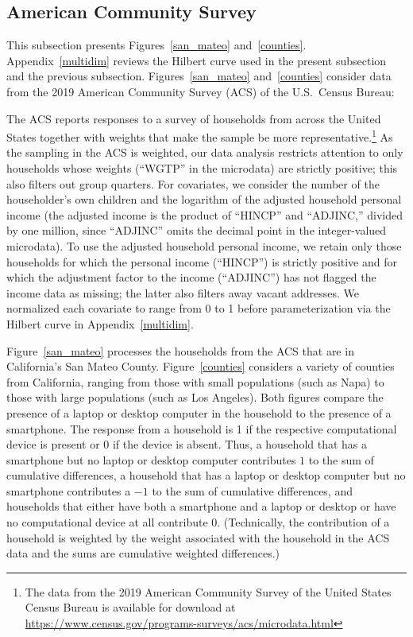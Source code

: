 \documentclass[]{fairmeta}
\begin{document}
\subsection{American Community Survey}
\label{acs}

This subsection presents Figures~\ref{san_mateo} and~\ref{counties}.
Appendix~\ref{multidim} reviews the Hilbert curve used
in the present subsection and the previous subsection.
Figures~\ref{san_mateo} and~\ref{counties} consider data
from the 2019 American Community Survey (ACS) of the U.S.\ Census Bureau:

The ACS reports responses to a survey of households from across the United
States together with weights that make the sample be more
representative.\footnote{The data from the 2019 American Community Survey
of the United States Census Bureau is available for download at
\url{https://www.census.gov/programs-surveys/acs/microdata.html}}
As the sampling in the ACS is weighted, our data analysis restricts attention
to only households whose weights (``WGTP'' in the microdata) are strictly
positive; this also filters out group quarters. For covariates, we consider
the number of the householder's own children and
the logarithm of the adjusted household personal income
(the adjusted income is the product of ``HINCP'' and ``ADJINC,''
divided by one million, since ``ADJINC'' omits the decimal point
in the integer-valued microdata).
To use the adjusted household personal income,
we retain only those households for which the personal income (``HINCP'')
is strictly positive and for which the adjustment factor to the income
(``ADJINC'') has not flagged the income data as missing;
the latter also filters away vacant addresses.
We normalized each covariate to range from 0 to 1 before parameterization
via the Hilbert curve in Appendix~\ref{multidim}.

Figure~\ref{san_mateo} processes the households from the ACS that are in
California's San Mateo County. Figure~\ref{counties} considers a variety
of counties from California, ranging from those with small populations
(such as Napa) to those with large populations (such as Los Angeles).
Both figures compare the presence of a laptop or desktop computer
in the household to the presence of a smartphone. The response from a household
is 1 if the respective computational device is present or 0 if the device is
absent. Thus, a household that has a smartphone but no laptop or desktop
computer contributes $1$ to the sum of cumulative differences,
a household that has a laptop or desktop computer but no smartphone
contributes a $-1$ to the sum of cumulative differences,
and households that either have both a smartphone and a laptop or desktop
or have no computational device at all contribute $0$.
(Technically, the contribution of a household is weighted by the weight
associated with the household in the ACS data and the sums are cumulative
weighted differences.)
\end{document}
